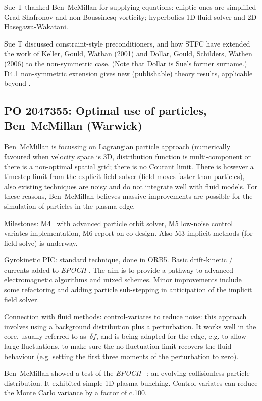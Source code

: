 Sue T thanked Ben~McMillan for supplying equations: elliptic ones are simplified 
Grad-Shafronov and non-Boussinesq vorticity; hyperbolics 1D fluid solver and 2D 
Hasegawa-Wakatani.

Sue T discussed constraint-style preconditioners, and how STFC have extended 
the work of Keller, Gould, Wathan (2001) and Dollar, Gould, Schilders, Wathen 
(2006) to the non-symmetric case.  (Note that Dollar is Sue's former surname.)
D4.1 non-symmetric extension gives new 
(publishable) theory results, applicable beyond \nep.

\subsection{PO 2047355: Optimal use of particles, Ben~McMillan (Warwick)}

Ben~McMillan is focussing on Lagrangian particle approach (numerically favoured when 
velocity space is 3D, distribution function is multi-component or there is a 
non-optimal spatial grid; there is no Courant limit.  There is however a 
timestep limit from the explicit field solver (field moves faster than 
particles), also existing techniques are noisy and do not integrate well with 
fluid models.  For these reasons, Ben~McMillan believes massive improvements are 
possible for the simulation of particles in the plasma edge.

Milestones: M4 \papp\  with advanced particle orbit solver, M5 low-noise 
control variates implementation, M6 report on co-design.  Also M3 implicit 
methods (for field solve) is underway.

Gyrokinetic PIC: standard technique, done in ORB5.  Basic drift-kinetic / 
currents added to {\it EPOCH} \papp.  The aim is to provide a pathway to 
advanced electromagnetic algorithms and mixed schemes.  Minor improvements 
include some refactoring and adding particle sub-stepping in anticipation of 
the implicit field solver.

Connection with fluid methods: control-variates to reduce noise: this approach 
involves using a background distribution plus a perturbation.  It works well in 
the core, usually referred to as~$\delta f$, and is being adapted for the edge,
e.g. to allow large fluctuations, 
to make sure the no-fluctuation limit recovers the fluid behaviour (e.g. 
setting the first three moments of the perturbation to zero).

Ben~McMillan showed a test of the {\it EPOCH} \papp\ ; an evolving collisionless 
particle distribution.  It exhibited simple 1D plasma bunching.  Control 
variates can reduce the Monte Carlo variance by a factor of c.100.

